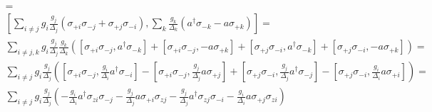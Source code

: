 \begin{multline}
[\sum\limits_{ij} g_i \frac{g_j}{\Delta_j} \left(\sigma_{+i} \sigma_{-j} + \sigma_{+j} \sigma_{-i}\right), \sum\limits_k \frac{g_k} {\Delta_k} (a^\dagger \sigma_{-k} - a \sigma_{+k})] = \\
[\sum\limits_{i \neq j} g_i \frac{g_j}{\Delta_j} \left(\sigma_{+i} \sigma_{-j} + \sigma_{+j} \sigma_{-i}\right), \sum\limits_k \frac{g_k} {\Delta_k} (a^\dagger \sigma_{-k} - a \sigma_{+k})] = \\
\sum\limits_{i \neq j, k} g_i \frac{g_j}{\Delta_j} \frac{g_k}{\Delta_k} \left(
[\sigma_{+i} \sigma_{-j},  a^\dagger \sigma_{-k}] +
[\sigma_{+i} \sigma_{-j},  - a \sigma_{+k}] +
[\sigma_{+j} \sigma_{-i},  a^\dagger \sigma_{-k}] +
[\sigma_{+j} \sigma_{-i}, - a \sigma_{+k}] \right) = \\
\sum\limits_{i \neq j} g_i \frac{g_j}{\Delta_j} \left(
[\sigma_{+i} \sigma_{-j}, \frac{g_i}{\Delta_i}  a^\dagger \sigma_{-i}] -
[\sigma_{+i} \sigma_{-j}, \frac{g_j}{\Delta_j} a \sigma_{+j}] +
[\sigma_{+j} \sigma_{-i}, \frac{g_j}{\Delta_j} a^\dagger \sigma_{-j}] -
[\sigma_{+j} \sigma_{-i}, \frac{g_i}{\Delta_i} a \sigma_{+i}] \right) = \\
\sum\limits_{i \neq j} g_i \frac{g_j}{\Delta_j} \left(
- \frac{g_i}{\Delta_i} a^\dagger \sigma_{zi} \sigma_{-j}
- \frac{g_j}{\Delta_j} a \sigma_{+i} \sigma_{zj}
- \frac{g_j}{\Delta_j} a^\dagger \sigma_{zj} \sigma_{-i}
- \frac{g_i}{\Delta_i} a \sigma_{+j} \sigma_{zi} \right)
\end{multline}

